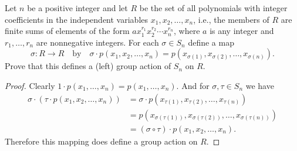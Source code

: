  Let $n$ be a positive integer and let $R$ be the set of
all polynomials with integer coefficients in the independent variables
$x_1,x_2,\dots,x_n$, i.e., the members of $R$ are finite sums of
elements of the form $ax_1^{r_1}x_2^{r_2}\cdots x_n^{r_n}$, where $a$
is any integer and $r_1,\dots,r_n$ are nonnegative integers. For each
$\sigma\in S_n$ define a map
\begin{equation*}
  \sigma\colon R\to R
  \quad\text{by}\quad
  \sigma\cdot p(x_1,x_2,\dots,x_n) = p(x_{\sigma(1)},x_{\sigma(2)},
  \dots,x_{\sigma(n)}).
\end{equation*}
Prove that this defines a (left) group action of $S_n$ on $R$.
\begin{proof}
  Clearly $1\cdot p(x_1,\dots,x_n) = p(x_1,\dots,x_n)$. And for
  $\sigma,\tau\in S_n$ we have
  \begin{align*}
    \sigma\cdot(\tau\cdot p(x_1,x_2,\dots,x_n))
    &= \sigma\cdot p(x_{\tau(1)},x_{\tau(2)},\dots,x_{\tau(n)}) \\
    &= p(x_{\sigma(\tau(1))},x_{\sigma(\tau(2))},\dots,x_{\sigma(\tau(n))}) \\
    &= (\sigma\circ\tau)\cdot p(x_1,x_2,\dots,x_n).
  \end{align*}
  Therefore this mapping does define a group action on $R$.
\end{proof}

